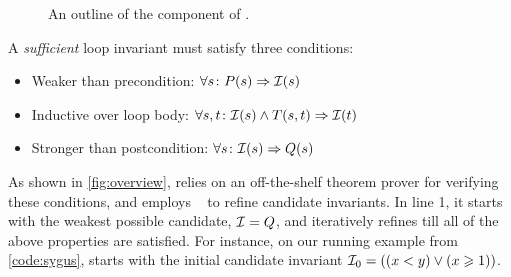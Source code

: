\documentclass[conference]{IEEEtran}
\begin{document}
\begin{figure}[!t]
    \caption{An outline of the \Infer component of \LoopInvGen.}
    \label{algo:infer}
\end{figure}


A \emph{sufficient} loop invariant \Inv must satisfy three conditions:
\begin{itemize}[leftmargin=1.25em]
    \item Weaker than precondition: \hspace*{4.5pt} $\forall s\colon P(s) \Rightarrow \mathcal{I}(s)$
    \item Inductive over loop body: \hspace*{7.75pt} $\forall s,t\colon \mathcal{I}(s) \wedge T(s,t) \Rightarrow \mathcal{I}(t)$
    \item Stronger than postcondition: $\forall s\colon \mathcal{I}(s) \Rightarrow Q(s)$
\end{itemize}
As shown in \cref{fig:overview}, \Infer relies on an off-the-shelf theorem prover \Checker for verifying these conditions,
and employs \PIE~\cite{Padhi2016DatadrivenPI} to refine candidate invariants.
In line 1, it starts with the weakest possible candidate,
$\mathcal{I} = Q$, and iteratively refines \Inv till all of the above properties are satisfied.
For instance, on our running example from \cref{code:sygus},
\Infer starts with the initial candidate invariant $\mathcal{I}_0 = ((x < y) \vee (x \geqslant 1))$.
\end{document}
